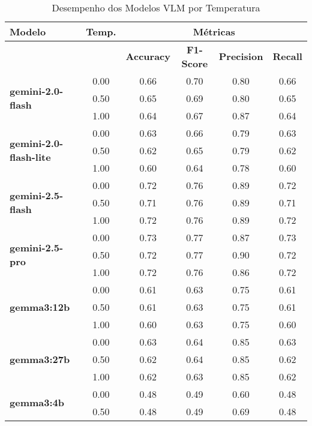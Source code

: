 \begin{table}[htbp]
  \centering
  \caption{Desempenho dos Modelos VLM por Temperatura}
  \label{tab:vlm_performance_report_com_temp_sem_tempo_exec}
  \
  \begin{tabular}{lccccc}
    \textbf{Modelo} & \textbf{Temp.} & \multicolumn{4}{c}{\textbf{Métricas}} \\
    \midrule
     &  & \textbf{Accuracy} & \textbf{F1-Score} & \textbf{Precision} & \textbf{Recall} \\
    \cmidrule(lr){3-6}
    \multirow{3}{*}{\textbf{gemini-2.0-flash}} & 0.00 & 0.66 & 0.70 & 0.80 & 0.66 \\
     & 0.50 & 0.65 & 0.69 & 0.80 & 0.65 \\
     & 1.00 & 0.64 & 0.67 & 0.87 & 0.64 \\
    \midrule
    \multirow{3}{*}{\textbf{gemini-2.0-flash-lite}} & 0.00 & 0.63 & 0.66 & 0.79 & 0.63 \\
     & 0.50 & 0.62 & 0.65 & 0.79 & 0.62 \\
     & 1.00 & 0.60 & 0.64 & 0.78 & 0.60 \\
    \midrule
    \multirow{3}{*}{\textbf{gemini-2.5-flash}} & 0.00 & 0.72 & 0.76 & 0.89 & 0.72 \\
     & 0.50 & 0.71 & 0.76 & 0.89 & 0.71 \\
     & 1.00 & 0.72 & 0.76 & 0.89 & 0.72 \\
    \midrule
    \multirow{3}{*}{\textbf{gemini-2.5-pro}} & 0.00 & 0.73 & 0.77 & 0.87 & 0.73 \\
     & 0.50 & 0.72 & 0.77 & 0.90 & 0.72 \\
     & 1.00 & 0.72 & 0.76 & 0.86 & 0.72 \\
    \midrule
    \multirow{3}{*}{\textbf{gemma3:12b}} & 0.00 & 0.61 & 0.63 & 0.75 & 0.61 \\
     & 0.50 & 0.61 & 0.63 & 0.75 & 0.61 \\
     & 1.00 & 0.60 & 0.63 & 0.75 & 0.60 \\
    \midrule
    \multirow{3}{*}{\textbf{gemma3:27b}} & 0.00 & 0.63 & 0.64 & 0.85 & 0.63 \\
     & 0.50 & 0.62 & 0.64 & 0.85 & 0.62 \\
     & 1.00 & 0.62 & 0.63 & 0.85 & 0.62 \\
    \midrule
    \multirow{3}{*}{\textbf{gemma3:4b}} & 0.00 & 0.48 & 0.49 & 0.60 & 0.48 \\
     & 0.50 & 0.48 & 0.49 & 0.69 & 0.48 \\

\end{tabular}
\end{table}
